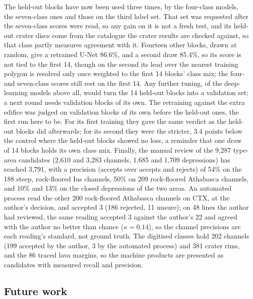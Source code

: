 \documentclass[twocolumn]{aastex701}
\begin{document}
The held-out blocks have now been used three times, by the four-class models, the seven-class ones and those on the
third label set. That set was requested after the seven-class scores were read, so any gain on it is not a fresh test,
and its held-out crater discs come from the catalogue the crater results are checked against, so that class partly
measures agreement with it. Fourteen other blocks, drawn at random, give a retrained U-Net 86.6\%, and a second draw 85.4\%,
so its score is not tied to the first 14, though on the second its lead over the nearest training polygon is resolved
only once weighted to the first 14 blocks' class mix; the four- and seven-class scores still rest on the first 14.
Any further tuning, of the deep-learning models above all, would
turn the 14 held-out blocks into a validation set; a next round needs validation blocks of its own. The retraining
against the extra edifice was judged on validation blocks of its own before the held-out ones, the first run here to
be. For its first training they gave the same verdict as the held-out blocks did afterwards; for its second they
were the stricter, 3.4 points below the control where the held-out blocks showed no loss, a reminder that one draw of
14 blocks holds its own class mix. Finally, the manual review of the 9,287 type-area candidates (2,610 and 3,283 channels, 1,685 and 1,709
depressions) has reached 3,791, with a precision (accepts over accepts and rejects) of 54\% on the 188 steep,
rock-floored Ius channels, 50\% on 209 rock-floored Athabasca channels, and 10\% and 13\% on the closed depressions
of the two areas. An automated process read the other 200 rock-floored Athabasca channels on CTX, at the author's
decision, and accepted 3 (186 rejected, 11 unsure); on 48 lines the author had reviewed, the same reading accepted 3
against the author's 22 and agreed with the author no better than chance ($\kappa=0.14$), so the channel precisions
are each reading's standard, not ground truth. The digitised classes hold 202 channels (199 accepted by the author, 3 by
the automated process) and 381 crater rims, and the 86 traced lava margins, so the machine products are presented as
candidates with measured recall and precision. %

\subsection{Future work}
\end{document}
